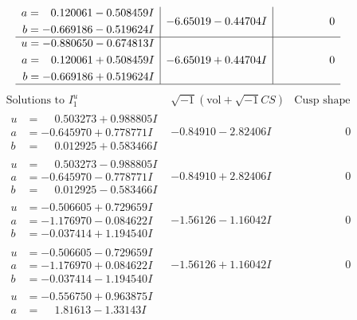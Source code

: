 \documentclass[1p]{elsarticle_modified}
\theoremstyle{definition}
\newcommand{\I}{\sqrt{-1}}
\begin{document}
$$\begin{array}{c|c|c}
\begin{aligned}
a &= \phantom{-}0.120061 - 0.508459 I \\
b &= -0.669186 - 0.519624 I\end{aligned}
 & -6.65019 - 0.44704 I & \phantom{-0.000000 } 0 \\ \hline\begin{aligned}
u &= -0.880650 - 0.674813 I \\
a &= \phantom{-}0.120061 + 0.508459 I \\
b &= -0.669186 + 0.519624 I\end{aligned}
 & -6.65019 + 0.44704 I & \phantom{-0.000000 } 0\\
 \hline 
 \end{array}$$\newpage$$\begin{array}{c|c|c}  
\text{Solutions to }I^u_{1}& \I (\text{vol} + \sqrt{-1}CS) & \text{Cusp shape}\\
 \hline 
\begin{aligned}
u &= \phantom{-}0.503273 + 0.988805 I \\
a &= -0.645970 + 0.778771 I \\
b &= \phantom{-}0.012925 + 0.583466 I\end{aligned}
 & -0.84910 - 2.82406 I & \phantom{-0.000000 } 0 \\ \hline\begin{aligned}
u &= \phantom{-}0.503273 - 0.988805 I \\
a &= -0.645970 - 0.778771 I \\
b &= \phantom{-}0.012925 - 0.583466 I\end{aligned}
 & -0.84910 + 2.82406 I & \phantom{-0.000000 } 0 \\ \hline\begin{aligned}
u &= -0.506605 + 0.729659 I \\
a &= -1.176970 - 0.084622 I \\
b &= -0.037414 + 1.194540 I\end{aligned}
 & -1.56126 - 1.16042 I & \phantom{-0.000000 } 0 \\ \hline\begin{aligned}
u &= -0.506605 - 0.729659 I \\
a &= -1.176970 + 0.084622 I \\
b &= -0.037414 - 1.194540 I\end{aligned}
 & -1.56126 + 1.16042 I & \phantom{-0.000000 } 0 \\ \hline\begin{aligned}
u &= -0.556750 + 0.963875 I \\
a &= \phantom{-}1.81613 - 1.33143 I \\

\end{aligned}
\end{array}$$
\end{document}
